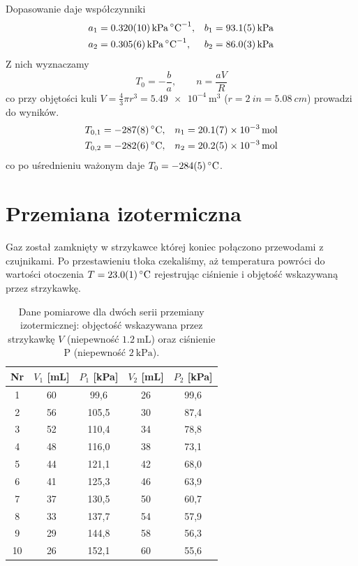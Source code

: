 \documentclass[12pt]{article}
\begin{document}
Dopasowanie daje współczynniki
\begin{align*}
  a_1 &= \SI{0.320\pm0.010}{\kilo\pascal\per\celsius}, & b_1 &= \SI{93.1\pm0.5}{\kilo\pascal}\\
  a_2 &= \SI{0.305\pm0.006}{\kilo\pascal\per\celsius}, & b_2 &= \SI{86.0\pm0.3}{\kilo\pascal}
\end{align*}
Z nich wyznaczamy
\[
  T_0 = -\frac{b}{a}, \qquad n = \frac{aV}{R}
\]
co przy objętości kuli \(V = \frac{4}{3}\pi r^3 = \SI{5.49e-4}{\meter^3}\) (\(r = \SI{2}{in} = \SI{5.08}{cm}\)) prowadzi do wyników.
\begin{align*}
  T_{0,1} &= \SI{-287\pm 8}{\celsius}, & n_1 &= \SI{20.1\pm0.7e-3}{\mole}\\
  T_{0,2} &= \SI{-282\pm 6}{\celsius}, & n_2 &= \SI{20.2\pm0.5e-3}{\mole}
\end{align*}
co po uśrednieniu ważonym daje \(T_0 = \SI{-284\pm 5}{\celsius}\).

\newpage 

\section{Przemiana izotermiczna}
Gaz został zamknięty w strzykawce której koniec połączono przewodami z czujnikami. Po przestawieniu tłoka czekaliśmy, aż temperatura powróci do wartości otoczenia \(T = \SI{23.0\pm0.1}{\celsius}\) rejestrując ciśnienie i objętość wskazywaną przez strzykawkę.

\begin{table}[H]
  \centering
  \begin{tabular}{c|cc|cc}
    \toprule
    \textbf{Nr} & $V_1$ [\si{\milli\liter}] & $P_1$ [\si{\kilo\pascal}] & $V_2$ [\si{\milli\liter}] & $P_2$ [\si{\kilo\pascal}] \\
    \midrule
    1  & 60 &  99,6 & 26 & 99,6 \\
    2  & 56 & 105,5 & 30 & 87,4 \\
    3  & 52 & 110,4 & 34 & 78,8 \\
    4  & 48 & 116,0 & 38 & 73,1 \\
    5  & 44 & 121,1 & 42 & 68,0 \\
    6  & 41 & 125,3 & 46 & 63,9 \\
    7  & 37 & 130,5 & 50 & 60,7 \\
    8  & 33 & 137,7 & 54 & 57,9 \\
    9  & 29 & 144,8 & 58 & 56,3 \\
    10 & 26 & 152,1 & 60 & 55,6 \\
    \bottomrule
  \end{tabular}
  \caption{Dane pomiarowe dla dwóch serii przemiany izotermicznej: objęctość wskazywana przez strzykawkę \(V\) (niepewność \(\SI{1.2}{\milli\liter}\)) oraz ciśnienie P (niepewność \(\SI{2}{\kilo\pascal}\)).}
  \label{tab:isothermal_data}
\end{table}
\end{document}
